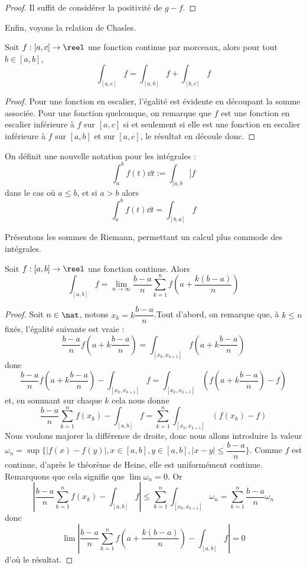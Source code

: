 \begin{proof}
    Il suffit de considérer la positivité de $g-f$.
\end{proof}

Enfin, voyons la relation de Chasles.

\begin{prop}
    Soit $f : [a,c]\to\reel$ une fonction continue par morceaux, alors pour tout $b\in[a,b]$, $$\int_{[a,c]} f = \int_{[a,b]}f+\int_{[b,c]} f$$
\end{prop}

\begin{proof}
    Pour une fonction en escalier, l'égalité est évidente en découpant la somme associée. Pour une fonction quelconque, on remarque que $f$ est une fonction en escalier inférieure à $f$ sur $[a,c]$ si et seulement si elle est une fonction en escalier inférieure à $f$ sur $[a,b]$ et sur $[a,c]$, le résultat en découle donc.
\end{proof}

\begin{rmk}
    On définit une nouvelle notation pour les intégrales : $$\int_a^b f(t)\dd t := \int_{[a,b}] f$$ dans le cas où $a \leq b$, et si $a > b$ alors $$\int_a^b f(t)\dd t = \int_{[b,a]} f$$
\end{rmk}

Présentons les sommes de Riemann, permettant un calcul plus commode des intégrales.

\begin{prop}
    Soit $f : [a,b] \to\reel$ une fonction continue. Alors $$\int_{[a,b]} f = \lim_{n\to\infty} \frac{b-a}{n}\sum_{k=1}^n f\left(a+\frac{k(b-a)}{n}\right)$$
\end{prop}

\begin{proof}
    Soit $n\in\nat$, notons $x_k = k\dfrac{b-a}{n}$.Tout d'abord, on remarque que, à $k\leq n$ fixés, l'égalité suivante est vraie : $$\dfrac{b-a}{n}f\left(a+k\dfrac{b-a}{n}\right)=\int_{[x_k,x_{k+1}]}f\left(a+k\dfrac{b-a}{n}\right)$$ donc $$\dfrac{b-a}{n}f\left(a+k\dfrac{b-a}{n}\right)-\int_{[x_k,x_{k+1}]}f = \int_{[x_k,x_{k+1}]} \left(f\left(a+k\dfrac{b-a}{n}\right)-f\right)$$ et, en sommant sur chaque $k$ cela nous donne $$\dfrac{b-a}{n}\sum_{k=1}^n f(x_k)-\int_{[a,b]}f =\sum_{k=1}^n \int_{[x_k,x_{k+1}]}(f(x_k)-f)$$ Nous voulons majorer la différence de droite, donc nous allons introduire la valeur $\omega_n = \sup\{|f(x)-f(y)|, x\in[a,b],y\in[a,b],|x-y|\leq \dfrac{b-a}{n}\}$. Comme $f$ est continue, d'après le théorème de Heine, elle est uniformément continue. Remarquons que cela signifie que $\lim \omega_n =0$. Or $$\left|\frac{b-a}{n}\sum_{k=1}^n f(x_k) - \int_{[a,b]} f\right|\leq \sum_{k=1}^n\int_{[x_k,x_{k+1}]} \omega_n = \sum_{k=1}^n \frac{b-a}{n}\omega_n$$ donc $$\boxed{\lim \left|\frac{b-a}{n}\sum_{k=1}^n f\left(a+\frac{k(b-a)}{n}\right) - \int_{[a,b]} f\right| = 0}$$ d'où le résultat. 
\end{proof}

